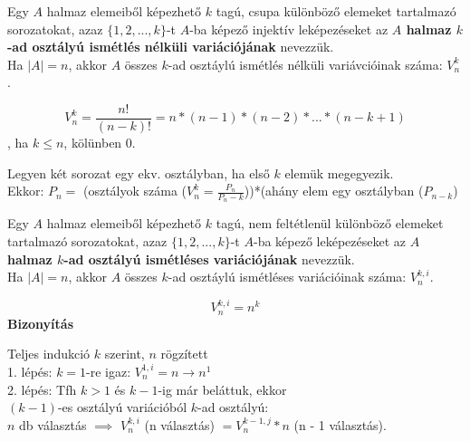 \begin{frame}
  \begin{tcolorbox}[title={Def.:Ismétlés nélküli variáció}]
    Egy $A$ halmaz elemeiből képezhető $k$ tagú, csupa különböző elemeket tartalmazó sorozatokat, azaz $\{ 1, 2, ..., k \}$-t $A$-ba képező injektív leképezéseket az \textbf{$A$ halmaz  $k$-ad osztályú ismétlés nélküli variációjának} nevezzük.\\
    Ha $|A| = n$, akkor $A$ összes $k$-ad osztáylú ismétlés nélküli variávcióinak száma: $V_n^k$.
  \end{tcolorbox}

  \begin{tcolorbox}[title={Tétel: Variációk száma}]
    $$V_n^k = \frac{n!}{(n - k)!} = n * (n - 1) * (n - 2) * ... * (n - k + 1)$$, ha $k \leq n$, kölünben 0.
  \end{tcolorbox}

  \begin{tcolorbox}[title={Bizonyítás}]
    Legyen két sorozat egy ekv. osztályban, ha első $k$ elemük megegyezik.\\
    Ekkor: $P_n = $ (osztályok száma ($V_n^k = \frac{P_n}{P_n - k}$))*(ahány elem egy osztályban ($P_{n - k}$)
  \end{tcolorbox}
\end{frame}

\begin{frame}
  \begin{tcolorbox}[title={Def.: Ismétléses Variáció}]
    Egy $A$ halmaz elemeiből képezhető $k$ tagú, nem feltétlenül különböző elemeket tartalmazó sorozatokat, azaz $\{ 1, 2, ..., k \}$-t $A$-ba képező leképezéseket az \textbf{$A$ halmaz  $k$-ad osztályú ismétléses variációjának} nevezzük.\\
    Ha $|A| = n$, akkor $A$ összes $k$-ad osztáylú ismétléses variációinak száma: $V_n^{k, i}$.
  \end{tcolorbox}

  \begin{tcolorbox}[title={Tétel: Ismétléses variációk száma}]
    $$V_n^{k, i} = n^k$$
  \tcblower
    \textbf{Bizonyítás}\\
    \mmedskip

    Teljes indukció $k$ szerint, $n$ rögzített\\
    1. lépés: $k = 1$-re igaz: $V_n^{1, i} = n \rightarrow n^1$\\
    2. lépés: Tfh $k > 1$ és $k - 1$-ig már beláttuk, ekkor\\
    $(k - 1)$-es osztályú variációból $k$-ad osztályú:\\
    $n$ db választás $\implies$ $V_n^{k, i}$ (n választás) $= V_n^{k - 1, j} * n$ (n - 1 választás).
  \end{tcolorbox}
\end{frame}

